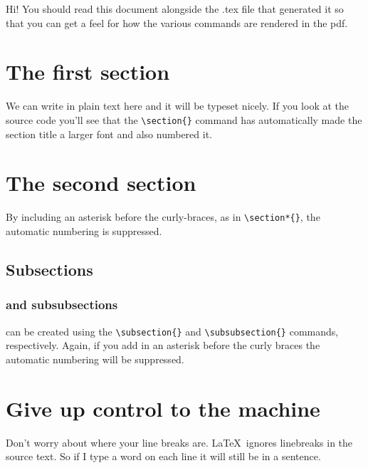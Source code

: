 \documentclass[12pt,a4paper]{article}
\begin{document}

Hi!  You should read this document alongside the .tex file that
generated it so that you can get a feel for how the various commands are
rendered in the pdf.  

\section{The first section}
  We can write in plain text here and it will be typeset nicely.  If you
  look at the source code you'll see that the \verb|\section{}| command 
    has automatically made the section title a larger font and also numbered it.  

  \section*{The second section}
    By including an asterisk before the curly-braces, as in
  \verb|\section*{}|,  the automatic numbering is suppressed.  

  \subsection{Subsections}
  \subsubsection{and subsubsections}
  can be created using the \verb|\subsection{}| and
  \verb|\subsubsection{}| commands, respectively.  Again, if you add in
  an asterisk before the curly braces the automatic numbering will be
  suppressed. 

\section{Give up control to the machine}
  Don't worry about where your line breaks are.  \LaTeX\ ignores
  linebreaks in the source text.  
  So
  if
  I
  type
  a
  word
  on
  each
  line
  it
  will
  still
  be
  in
  a
  sentence.
\end{document}
